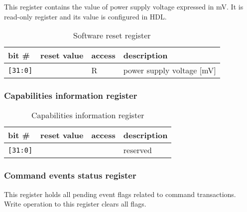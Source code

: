     This register contains the value of power supply voltage expressed in mV. It is read-only register and its
    value is configured in HDL.
    
    \begin{table}[H]
    \caption{Software reset register}
        \begin{tabular}{m{1.3cm}|m{2cm}|m{1cm}|m{8cm}}
                \rowcolor[gray]{0.7} bit \# & reset value & access & description \\ \hline \hline
                \texttt{[31:0]} & & R & power supply voltage [mV] \\ \hline
                \hline
        \end{tabular}
        \label{tab:voltage_reg}
    \end{table}
    
    \subsubsection{Capabilities information register}
    \label{sec:capa_reg}
    
    \begin{table}[H]
    \caption{Capabilities information register}
        \begin{tabular}{m{1.3cm}|m{2cm}|m{1cm}|m{8cm}}
                \rowcolor[gray]{0.7} bit \# & reset value & access & description \\ \hline \hline
                \texttt{[31:0]} & & & reserved \\ \hline
                \hline
        \end{tabular}
        \label{tab:capa_reg}
    \end{table}
    
    \subsubsection{Command events status register}
    \label{sec:cmd_evt_reg}
    
    This register holds all pending event flags related to command transactions. Write operation to this register
    clears all flags.
    
